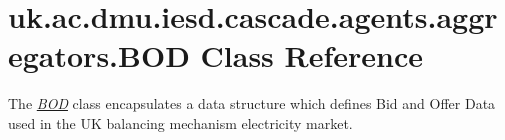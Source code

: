 \hypertarget{classuk_1_1ac_1_1dmu_1_1iesd_1_1cascade_1_1agents_1_1aggregators_1_1_b_o_d}{\section{uk.\-ac.\-dmu.\-iesd.\-cascade.\-agents.\-aggregators.\-B\-O\-D Class Reference}
\label{classuk_1_1ac_1_1dmu_1_1iesd_1_1cascade_1_1agents_1_1aggregators_1_1_b_o_d}
}


The {\itshape \hyperlink{classuk_1_1ac_1_1dmu_1_1iesd_1_1cascade_1_1agents_1_1aggregators_1_1_b_o_d}{B\-O\-D}} class encapsulates a data structure which defines Bid and Offer Data used in the U\-K balancing mechanism electricity market.  


